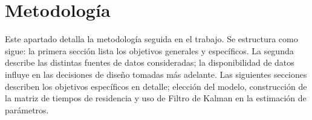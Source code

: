 \chapter{Metodología} \label{chap:metod}

Este apartado detalla la metodología seguida en el trabajo. Se estructura como sigue: la primera sección lista los objetivos generales y específicos. La segunda describe las distintas fuentes de datos consideradas; la disponibilidad de datos influye en las decisiones de diseño tomadas más adelante. Las siguientes secciones describen los objetivos específicos en detalle; elección del modelo, construcción de la matriz de tiempos de residencia y uso de Filtro de Kalman en la estimación de parámetros.


    
    
    
